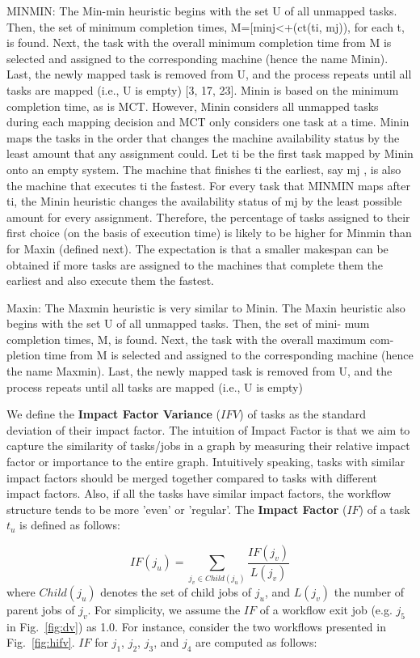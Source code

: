 \documentclass[final]{IEEEtran}
\begin{document}
MINMIN: The Min-min heuristic begins with the set U of all unmapped tasks. Then, the set of minimum completion times, M=[minj<+(ct(ti, mj)), for each t, is found. Next, the task with the overall minimum completion time from M is selected and assigned to the corresponding machine (hence the name Minin). Last, the newly mapped task is removed from U, and the process repeats until all tasks are mapped (i.e., U is empty) [3, 17, 23]. Minin is based on the minimum completion time, as is MCT. However, Minin considers all unmapped tasks during each mapping decision and MCT only considers one task at a time.
Minin maps the tasks in the order that changes the machine availability status by the least amount that any assignment could. Let ti be the first task mapped by Minin onto an empty system. The machine that finishes ti the earliest, say mj , is also the machine that executes ti the fastest. For every task that MINMIN maps after ti, the Minin heuristic changes the availability status of mj by the least possible amount for every assignment. Therefore, the percentage of tasks assigned to their first choice (on the basis of execution time) is likely to be higher for Minmin than for Maxin (defined next). The expectation is that a smaller makespan can be obtained if more tasks are assigned to the machines that complete them the earliest and also execute them the fastest.


Maxin: The Maxmin heuristic is very similar to Minin. The Maxin heuristic also begins with the set U of all unmapped tasks. Then, the set of mini- mum completion times, M, is found. Next, the task with the overall maximum com- pletion time from M is selected and assigned to the corresponding machine (hence the name Maxmin). Last, the newly mapped task is removed from U, and the process repeats until all tasks are mapped (i.e., U is empty) 


We define the \textbf{Impact Factor Variance} ($IFV$) of tasks as the standard deviation of their impact factor. The intuition of Impact Factor is that we aim to capture the similarity of tasks/jobs in a graph by measuring their relative impact factor or importance to the entire graph. Intuitively speaking, tasks with similar impact factors should be merged together compared to tasks with different impact factors. Also, if all the tasks have similar impact factors, the workflow structure tends to be more 'even' or 'regular'. The \textbf{Impact Factor} ($IF$) of a task $t_u$ is defined as follows:

\begin{equation}
	IF(j_u)=\sum_{j_v\in Child(j_u)}^{}\frac{IF(j_v)}{L(j_v)}
\end{equation}
where $Child(j_u)$ denotes the set of child jobs of $j_u$, and $L(j_v)$ the number of parent jobs of $j_v$. For simplicity, we assume the $IF$ of a workflow exit job (e.g. $j_5$ in Fig.~\ref{fig:dv}) as 1.0. For instance, consider the two workflows presented in Fig.~\ref{fig:hifv}. $IF$ for $j_1$, $j_2$, $j_3$, and $j_4$ are computed as follows:
\end{document}
